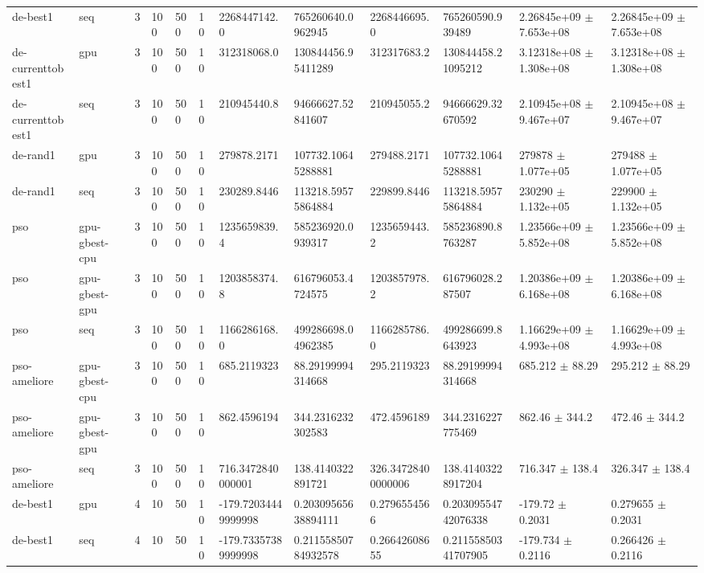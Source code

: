 \begin{table}[t]
\begin{tabular}{llllllllllll}
de-best1 & seq & 3 & 100 & 500 & 10 & 2268447142.0 & 765260640.0962945 & 2268446695.0 & 765260590.939489 & 2.26845e+09 $\pm$ 7.653e+08 & 2.26845e+09 $\pm$ 7.653e+08 \\
de-currenttobest1 & gpu & 3 & 100 & 500 & 10 & 312318068.0 & 130844456.95411289 & 312317683.2 & 130844458.21095212 & 3.12318e+08 $\pm$ 1.308e+08 & 3.12318e+08 $\pm$ 1.308e+08 \\
de-currenttobest1 & seq & 3 & 100 & 500 & 10 & 210945440.8 & 94666627.52841607 & 210945055.2 & 94666629.32670592 & 2.10945e+08 $\pm$ 9.467e+07 & 2.10945e+08 $\pm$ 9.467e+07 \\
de-rand1 & gpu & 3 & 100 & 500 & 10 & 279878.2171 & 107732.10645288881 & 279488.2171 & 107732.10645288881 & 279878 $\pm$ 1.077e+05 & 279488 $\pm$ 1.077e+05 \\
de-rand1 & seq & 3 & 100 & 500 & 10 & 230289.8446 & 113218.59575864884 & 229899.8446 & 113218.59575864884 & 230290 $\pm$ 1.132e+05 & 229900 $\pm$ 1.132e+05 \\
pso & gpu-gbest-cpu & 3 & 100 & 500 & 10 & 1235659839.4 & 585236920.0939317 & 1235659443.2 & 585236890.8763287 & 1.23566e+09 $\pm$ 5.852e+08 & 1.23566e+09 $\pm$ 5.852e+08 \\
pso & gpu-gbest-gpu & 3 & 100 & 500 & 10 & 1203858374.8 & 616796053.4724575 & 1203857978.2 & 616796028.287507 & 1.20386e+09 $\pm$ 6.168e+08 & 1.20386e+09 $\pm$ 6.168e+08 \\
pso & seq & 3 & 100 & 500 & 10 & 1166286168.0 & 499286698.04962385 & 1166285786.0 & 499286699.8643923 & 1.16629e+09 $\pm$ 4.993e+08 & 1.16629e+09 $\pm$ 4.993e+08 \\
pso-ameliore & gpu-gbest-cpu & 3 & 100 & 500 & 10 & 685.2119323 & 88.29199994314668 & 295.2119323 & 88.29199994314668 & 685.212 $\pm$ 88.29 & 295.212 $\pm$ 88.29 \\
pso-ameliore & gpu-gbest-gpu & 3 & 100 & 500 & 10 & 862.4596194 & 344.2316232302583 & 472.4596189 & 344.2316227775469 & 862.46 $\pm$ 344.2 & 472.46 $\pm$ 344.2 \\
pso-ameliore & seq & 3 & 100 & 500 & 10 & 716.3472840000001 & 138.4140322891721 & 326.34728400000006 & 138.41403228917204 & 716.347 $\pm$ 138.4 & 326.347 $\pm$ 138.4 \\
de-best1 & gpu & 4 & 10 & 50 & 10 & -179.72034449999998 & 0.20309565638894111 & 0.2796554566 & 0.20309554742076338 & -179.72 $\pm$ 0.2031 & 0.279655 $\pm$ 0.2031 \\
de-best1 & seq & 4 & 10 & 50 & 10 & -179.73357389999998 & 0.21155850784932578 & 0.26642608655 & 0.21155850341707905 & -179.734 $\pm$ 0.2116 & 0.266426 $\pm$ 0.2116 \\

\end{tabular}
\end{table}

